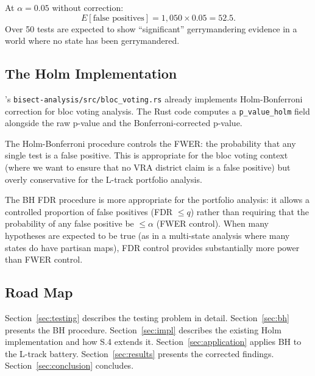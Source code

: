 At $\alpha = 0.05$ without correction:
\[
  E[\text{false positives}] = 1{,}050 \times 0.05 = 52.5.
\]
Over 50 tests are expected to show ``significant'' gerrymandering evidence
in a world where no state has been gerrymandered.

\subsection{The Holm Implementation}

\bisect{}'s \texttt{bisect-analysis/src/bloc\_voting.rs} already implements
Holm-Bonferroni correction for bloc voting analysis.
The Rust code computes a \texttt{p\_value\_holm} field alongside the
raw p-value and the Bonferroni-corrected p-value.

The Holm-Bonferroni procedure controls the FWER: the probability that any
single test is a false positive.
This is appropriate for the bloc voting context (where we want to ensure
that no VRA district claim is a false positive) but overly conservative
for the L-track portfolio analysis.

The BH FDR procedure is more appropriate for the portfolio analysis:
it allows a controlled proportion of false positives (FDR $\leq q$)
rather than requiring that the probability of any false positive be
$\leq \alpha$ (FWER control).
When many hypotheses are expected to be true (as in a multi-state
analysis where many states do have partisan maps), FDR control provides
substantially more power than FWER control.

\subsection{Road Map}

Section~\ref{sec:testing} describes the testing problem in detail.
Section~\ref{sec:bh} presents the BH procedure.
Section~\ref{sec:impl} describes the existing Holm implementation and
how S.4 extends it.
Section~\ref{sec:application} applies BH to the L-track battery.
Section~\ref{sec:results} presents the corrected findings.
Section~\ref{sec:conclusion} concludes.
